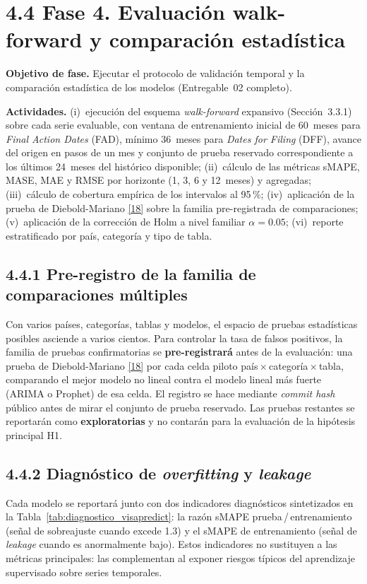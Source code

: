 \documentclass[12pt,letterpaper]{report}
\newcommand{\cita}[1]{\hyperref[bib:#1]{[#1]}}
\begin{document}
\section{4.4 Fase 4. Evaluación walk-forward y comparación estadística}

\textbf{Objetivo de fase.} Ejecutar el protocolo de validación temporal y la comparación estadística de los modelos (Entregable~02 completo).

\textbf{Actividades.} (i)~ejecución del esquema \textit{walk-forward} expansivo (Sección~3.3.1) sobre cada serie evaluable, con ventana de entrenamiento inicial de 60~meses para \textit{Final Action Dates} (FAD), mínimo 36~meses para \textit{Dates for Filing} (DFF), avance del origen en pasos de un mes y conjunto de prueba reservado correspondiente a los últimos 24~meses del histórico disponible; (ii)~cálculo de las métricas sMAPE, MASE, MAE y RMSE por horizonte (1, 3, 6 y 12~meses) y agregadas; (iii)~cálculo de cobertura empírica de los intervalos al 95\,\%; (iv)~aplicación de la prueba de Diebold-Mariano \cita{18} sobre la familia pre-registrada de comparaciones; (v)~aplicación de la corrección de Holm a nivel familiar $\alpha = 0.05$; (vi)~reporte estratificado por país, categoría y tipo de tabla.

\subsection*{4.4.1 Pre-registro de la familia de comparaciones múltiples}

Con varios países, categorías, tablas y modelos, el espacio de pruebas estadísticas posibles asciende a varios cientos. Para controlar la tasa de falsos positivos, la familia de pruebas confirmatorias se \textbf{pre-registrará} antes de la evaluación: una prueba de Diebold-Mariano \cita{18} por cada celda piloto país\,$\times$\,categoría\,$\times$\,tabla, comparando el mejor modelo no lineal contra el modelo lineal más fuerte (ARIMA o Prophet) de esa celda. El registro se hace mediante \textit{commit hash} público antes de mirar el conjunto de prueba reservado. Las pruebas restantes se reportarán como \textbf{exploratorias} y no contarán para la evaluación de la hipótesis principal H1.

\subsection*{4.4.2 Diagnóstico de \textit{overfitting} y \textit{leakage}}

Cada modelo se reportará junto con dos indicadores diagnósticos sintetizados en la Tabla~\ref{tab:diagnostico_visapredict}: la razón sMAPE prueba\,/\,entrenamiento (señal de sobreajuste cuando excede 1.3) y el sMAPE de entrenamiento (señal de \textit{leakage} cuando es anormalmente bajo). Estos indicadores no sustituyen a las métricas principales: las complementan al exponer riesgos típicos del aprendizaje supervisado sobre series temporales.
\end{document}

